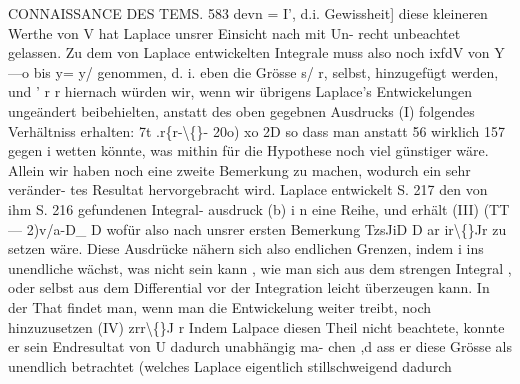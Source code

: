 \documentclass[12pt,a4paper]{article}
\begin{document}
\newpage
CONNAISSANCE DES TEMS. 583\newline
devn = I', d.i. Gewissheit] diese kleineren Werthe von V hat Laplace unsrer Einsicht nach mit Un-\newline
recht unbeachtet gelassen. Zu dem von Laplace entwickelten Integrale muss also noch ixfdV von\newline
Y---o bis y= y/ genommen, d. i. eben die Grösse s/ r, selbst, hinzugefügt werden, und\newline
' r r\newline
hiernach würden wir, wenn wir übrigens Laplace's Entwickelungen ungeändert beibehielten, anstatt\newline
des oben gegebnen Ausdrucks (I) folgendes Verhältniss erhalten:\newline
7t .r\{r-\textbackslash\{\}- 20o)\newline
xo 2D\newline
so dass man anstatt 56 wirklich 157 gegen i wetten könnte, was mithin für die Hypothese noch viel\newline
günstiger wäre. Allein wir haben noch eine zweite Bemerkung zu machen, wodurch ein sehr veränder-\newline
tes Resultat hervorgebracht wird. Laplace entwickelt S. 217 den von ihm S. 216 gefundenen Integral-\newline
ausdruck (b) i n eine Reihe, und erhält (III)\newline
(TT --- 2)v/a-D\_ D\newline
wofür also nach unsrer ersten Bemerkung\newline
TzsJiD D\newline
ar ir\textbackslash\{\}Jr\newline
zu setzen wäre. Diese Ausdrücke nähern sich also endlichen Grenzen, indem i ins unendliche wächst,\newline
was nicht sein kann , wie man sich aus dem strengen Integral , oder selbst aus dem Differential vor der\newline
Integration leicht überzeugen kann. In der That findet man, wenn man die Entwickelung weiter treibt,\newline
noch hinzuzusetzen (IV)\newline
zrr\textbackslash\{\}J r\newline
Indem Lalpace diesen Theil nicht beachtete, konnte er sein Endresultat von U dadurch unabhängig ma-\newline
chen ,d ass er diese Grösse als unendlich betrachtet (welches Laplace eigentlich stillschweigend dadurch\newline
\end{document}
